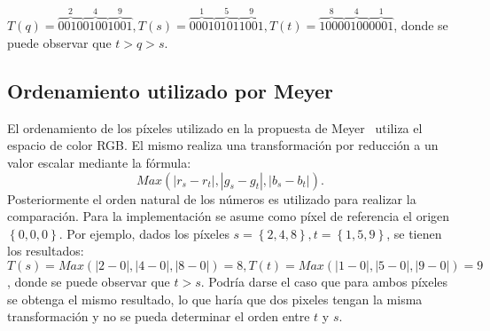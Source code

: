 $T(q)=\overbrace{0010}^2\overbrace{0100}^4\overbrace{1001}^9,
T(s)=\overbrace{0001}^1\overbrace{0101}^5\overbrace{1001}^9,
T(t)=\overbrace{1000}^8\overbrace{0100}^4\overbrace{0001}^1$, donde se puede observar que $t>q>s$.

\subsection{Ordenamiento utilizado por Meyer}
\label{chap:marco-meyer}
El ordenamiento de los píxeles utilizado en la propuesta de Meyer~\cite{Meyer} utiliza el espacio de color RGB. El mismo realiza una transformación por reducción a un valor escalar mediante la fórmula:
 
\begin{equation}
Max\left(|r_{s}-r_{t}|,|g_{s}-g_{t}|,|b_{s}-b_{t}|\right).
\end{equation}
Posteriormente el orden natural de los números es utilizado para realizar la comparación. Para la implementación se asume como píxel de referencia el origen $\left\{0,0,0\right\}$.
Por ejemplo, dados los píxeles $s=\left\{2,4,8\right\}, t=\left\{1,5,9\right\}$, se tienen los resultados:
$T(s)=Max\left(|2-0|,|4-0|,|8-0|\right)=8,
T(t)=Max\left(|1-0|,|5-0|,|9-0|\right)=9$, donde se puede observar que $t>s$. Podría darse el caso que para ambos píxeles se obtenga el mismo resultado, lo que haría que dos pixeles tengan la misma transformación y no se pueda determinar el orden entre $t$ y $s$.